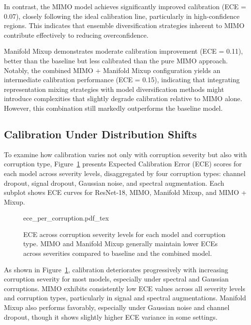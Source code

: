 In contrast, the MIMO model achieves significantly improved calibration (ECE = 0.07), closely following the ideal calibration line, particularly in high-confidence regions. This indicates that ensemble diversification strategies inherent to MIMO contribute effectively to reducing overconfidence.

Manifold Mixup demonstrates moderate calibration improvement (ECE = 0.11), better than the baseline but less calibrated than the pure MIMO approach. Notably, the combined MIMO + Manifold Mixup configuration yields an intermediate calibration performance (ECE = 0.15), indicating that integrating representation mixing strategies with model diversification methods might introduce complexities that slightly degrade calibration relative to MIMO alone. However, this combination still markedly outperforms the baseline model.

\subsection{Calibration Under Distribution Shifts}
\label{subsec:calibration_corruptions}
To examine how calibration varies not only with corruption severity but also with corruption type, Figure~\ref{fig:ece_corruptions} presents Expected Calibration Error (ECE) scores for each model across severity levels, disaggregated by four corruption types: channel dropout, signal dropout, Gaussian noise, and spectral augmentation. Each subplot shows ECE curves for ResNet-18, MIMO, Manifold Mixup, and MIMO + Mixup.

\begin{figure}[h!]
	\centering
    \def\svgwidth{400pt}
 	{ece_per_corruption.pdf_tex} 
	\caption[ECE across corruption severity levels for each model and corruption type.]{ECE across corruption severity levels for each model and corruption type. MIMO and Manifold Mixup generally maintain lower ECEs across severities compared to baseline and the combined model.}
    \label{fig:ece_corruptions}
\end{figure}

As shown in Figure~\ref{fig:ece_corruptions}, calibration deteriorates progressively with increasing corruption severity for most models, especially under spectral and Gaussian corruptions. MIMO exhibits consistently low ECE values across all severity levels and corruption types, particularly in signal and spectral augmentations. Manifold Mixup also performs favorably, especially under Gaussian noise and channel dropout, though it shows slightly higher ECE variance in some settings.

